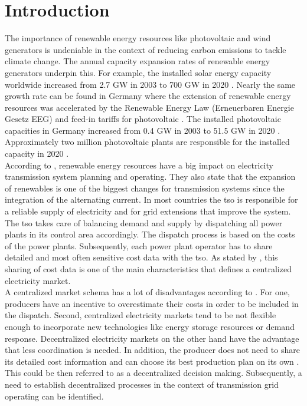\section{Introduction}
\label{sec:intro}

The importance of renewable energy resources like photovoltaic and wind generators is undeniable in the context of reducing carbon emissions to tackle climate change. The annual capacity expansion rates of renewable energy generators underpin this. For example, the installed solar energy capacity worldwide increased from 2.7 GW in 2003 to 700 GW in 2020 \citep{ritchie2020}. Nearly the same growth rate can be found in Germany where the extension of renewable energy resources was accelerated by the Renewable Energy Law (Erneuerbaren Energie Gesetz EEG) and feed-in tariffs for photovoltaic \citep{pesch2014}. The installed photovoltaic capacities in Germany increased from 0.4 GW in 2003 to 51.5 GW in 2020 \citep{bundesnetzagentur2021}. Approximately two million photovoltaic plants are responsible for the installed capacity in 2020 \citep{bundesnetzagentur2021}.\\

According to \citet{quint2019}, renewable energy resources have a big impact on electricity transmission system planning and operating. They also state that the expansion of renewables is one of the biggest changes for transmission systems since the integration of the alternating current. In most countries the \gls{tso} is responsible for a reliable supply of electricity and for grid extensions that improve the system. The \gls{tso} takes care of balancing demand and supply by dispatching all power plants in its control area accordingly. The dispatch process is based on the costs of the power plants. Subsequently, each power plant operator has to share detailed and most often sensitive cost data with the \gls{tso}. As stated by \citet{ahlqvist2022}, this sharing of cost data is one of the main characteristics that defines a centralized electricity market. \\

A centralized market schema has a lot of disadvantages according to \citet{ahlqvist2022}. For one, producers have an incentive to overestimate their costs in order to be included in the dispatch. Second, centralized electricity markets tend to be not flexible enough to incorporate new technologies like energy storage resources or demand response. Decentralized electricity markets on the other hand have the advantage that less coordination is needed. In addition, the producer does not need to share its detailed cost information and can choose its best production plan on its own \citep{ahlqvist2022}. This could be then referred to as a decentralized decision making. Subsequently, a need to establish decentralized processes in the context of transmission grid operating can be identified. \\

